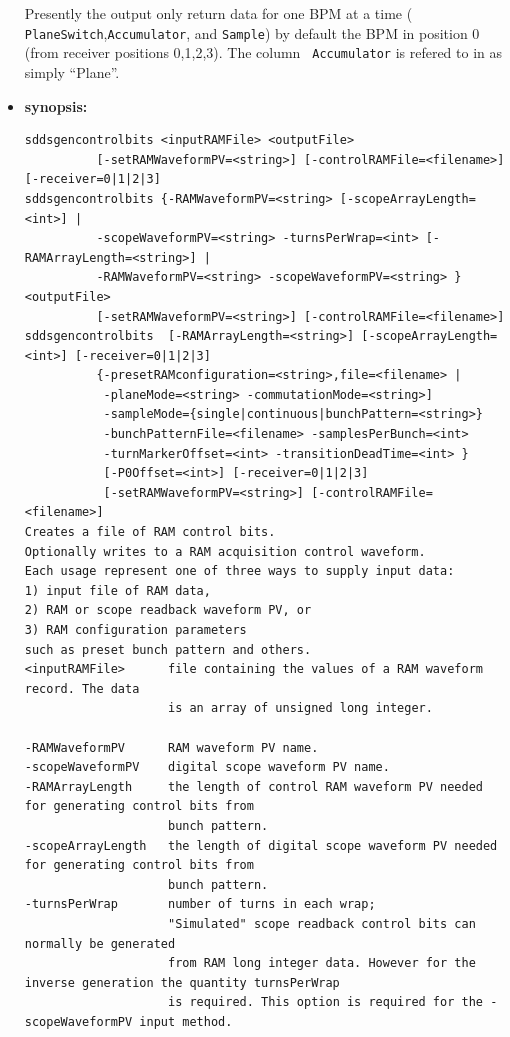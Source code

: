 \begin{itemize}
Presently the output only return data for one BPM at a time ({\tt
PlaneSwitch},{\tt Accumulator}, and {\tt Sample}) by default the BPM
in position 0 (from receiver positions 0,1,2,3). The column {\tt
Accumulator} is refered to in \cite{Norum2007} as simply ``Plane''.

\item {\bf synopsis:} 
%
%
\small
\begin{verbatim}
sddsgencontrolbits <inputRAMFile> <outputFile> 
          [-setRAMWaveformPV=<string>] [-controlRAMFile=<filename>] [-receiver=0|1|2|3] 
sddsgencontrolbits {-RAMWaveformPV=<string> [-scopeArrayLength=<int>] | 
          -scopeWaveformPV=<string> -turnsPerWrap=<int> [-RAMArrayLength=<string>] | 
          -RAMWaveformPV=<string> -scopeWaveformPV=<string> } <outputFile> 
          [-setRAMWaveformPV=<string>] [-controlRAMFile=<filename>] 
sddsgencontrolbits  [-RAMArrayLength=<string>] [-scopeArrayLength=<int>] [-receiver=0|1|2|3] 
          {-presetRAMconfiguration=<string>,file=<filename> | 
           -planeMode=<string> -commutationMode=<string>] 
           -sampleMode={single|continuous|bunchPattern=<string>} 
           -bunchPatternFile=<filename> -samplesPerBunch=<int> 
           -turnMarkerOffset=<int> -transitionDeadTime=<int> } 
           [-P0Offset=<int>] [-receiver=0|1|2|3] 
           [-setRAMWaveformPV=<string>] [-controlRAMFile=<filename>] 
Creates a file of RAM control bits.
Optionally writes to a RAM acquisition control waveform.
Each usage represent one of three ways to supply input data:
1) input file of RAM data,
2) RAM or scope readback waveform PV, or
3) RAM configuration parameters 
such as preset bunch pattern and others.
<inputRAMFile>      file containing the values of a RAM waveform record. The data 
                    is an array of unsigned long integer.

-RAMWaveformPV      RAM waveform PV name. 
-scopeWaveformPV    digital scope waveform PV name. 
-RAMArrayLength     the length of control RAM waveform PV needed for generating control bits from 
                    bunch pattern.
-scopeArrayLength   the length of digital scope waveform PV needed for generating control bits from 
                    bunch pattern.
-turnsPerWrap       number of turns in each wrap; 
                    "Simulated" scope readback control bits can normally be generated 
                    from RAM long integer data. However for the inverse generation the quantity turnsPerWrap 
                    is required. This option is required for the -scopeWaveformPV input method.


\end{verbatim}
\end{itemize}
